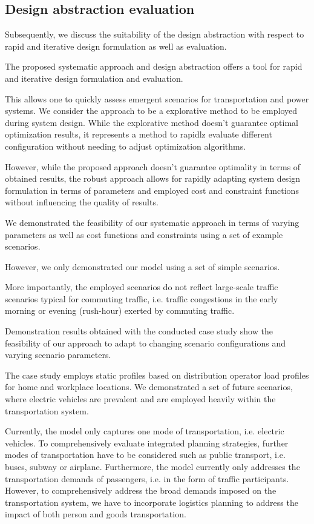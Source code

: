 \subsection{Design abstraction evaluation}
\label{discussion}
Subsequently, we discuss the suitability of the design abstraction with respect to rapid and iterative design formulation as well as evaluation.

The proposed systematic approach and design abstraction offers a tool for rapid and iterative design formulation and evaluation. 

This allows one to quickly assess emergent scenarios for transportation and power systems. We consider the approach to be a explorative method to be employed during system design. While the explorative method doesn't guarantee optimal optimization results, it represents a method to rapidlz evaluate different configuration without needing to adjust optimization algorithms. 

However, while the proposed approach doesn't guarantee optimality in terms of obtained results, the robust approach allows for rapidly adapting system design formulation in terms of parameters and employed cost and constraint functions without influencing the quality of results. 

We demonstrated the feasibility of our systematic approach in terms of varying parameters as well as cost functions and constraints using a set of example scenarios.

However, we only demonstrated our model using a set of simple scenarios. 

More importantly, the employed scenarios do not reflect large-scale traffic scenarios typical for commuting traffic, i.e. traffic congestions in the early morning or evening (rush-hour) exerted by commuting traffic.

Demonstration results obtained with the conducted case study show the feasibility of our approach to adapt to changing scenario configurations and varying scenario parameters.

The case study employs static profiles based on distribution operator load profiles for home and workplace locations. We demonstrated a set of future scenarios, where electric vehicles are prevalent and are employed heavily within the transportation system. 

Currently, the model only captures one mode of transportation, i.e. electric vehicles. To comprehensively evaluate integrated planning strategies, further modes of transportation have to be considered such as public transport, i.e. buses, subway or airplane. Furthermore, the model currently only addresses the transportation demands of passengers, i.e. in the form of traffic participants. However, to comprehensively address the broad demands imposed on the transportation system, we have to incorporate logistics planning to address the impact of both person and goods transportation. 

